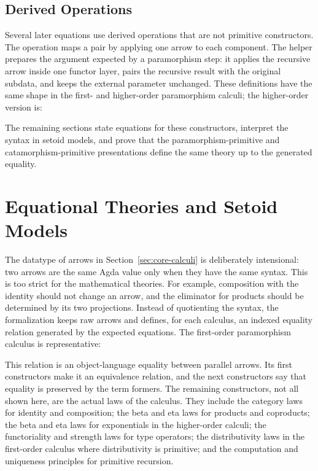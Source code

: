 \documentclass[sigplan,10pt,anonymous,review,screen]{acmart}
\begin{document}
\subsection{Derived Operations}
\label{sec:core-calculi-derived}

Several later equations use derived operations that are not primitive
constructors.  The operation  maps a pair by applying
one arrow to each component.  The helper 
prepares the argument expected by a paramorphism step: it applies the
recursive arrow inside one functor layer, pairs the recursive result with
the original subdata, and keeps the external parameter unchanged.  These
definitions have the same shape in the first- and higher-order
paramorphism calculi; the higher-order version is:

{\small
\CorePRHODerivedOperations*
}

The remaining sections state equations for these constructors, interpret
the syntax in setoid models, and prove that the paramorphism-primitive
and catamorphism-primitive presentations define the same theory up to the
generated equality.

\section{Equational Theories and Setoid Models}
\label{sec:equations-models}

The datatype of arrows in Section~\ref{sec:core-calculi} is deliberately
intensional: two arrows are the same Agda value only when they have the
same syntax.  This is too strict for the mathematical theories.  For
example, composition with the identity should not change an arrow, and
the eliminator for products should be determined by its two projections.
Instead of quotienting the syntax, the formalization keeps raw arrows and
defines, for each calculus, an indexed equality relation generated by the
expected equations.  The first-order paramorphism calculus is
representative:

{\small
\CorePRFOEquivalence*
}

This relation is an object-language equality between parallel arrows.
Its first constructors make it an equivalence relation, and the next
constructors say that equality is preserved by the term formers.  The
remaining constructors, not all shown here, are the actual laws of the
calculus.  They include the category laws for identity and composition;
the beta and eta laws for products and coproducts; the beta and eta laws
for exponentials in the higher-order calculi; the functoriality and
strength laws for type operators; the distributivity laws in the
first-order calculus where distributivity is primitive; and the
computation and uniqueness principles for primitive recursion.
\end{document}
